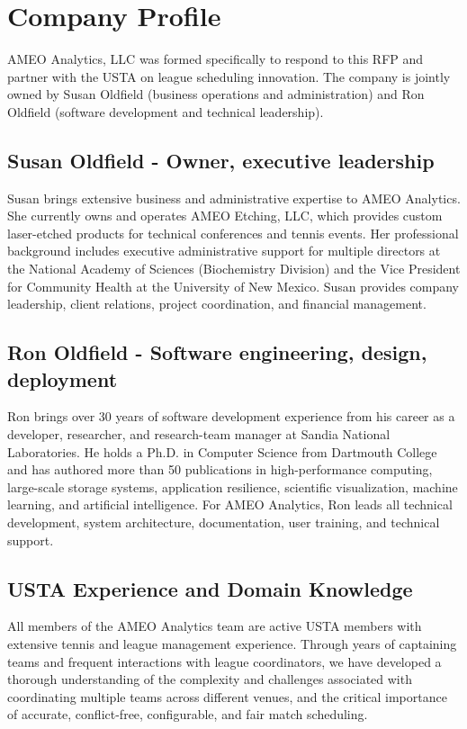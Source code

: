 \section{Company Profile}

AMEO Analytics, LLC was formed specifically to respond to this RFP and partner with the USTA on league scheduling innovation. The company is jointly owned by Susan Oldfield (business operations and administration) and Ron Oldfield (software development and technical leadership).

\subsection*{Susan Oldfield - Owner, executive leadership}
Susan brings extensive business and administrative expertise to AMEO Analytics. She currently owns and operates AMEO Etching, LLC, which provides custom laser-etched products for technical conferences and tennis events. Her professional background includes executive administrative support for multiple directors at the National Academy of Sciences (Biochemistry Division) and the Vice President for Community Health at the University of New Mexico. Susan provides company leadership, client relations, project coordination, and financial management.

\subsection*{Ron Oldfield - Software engineering, design, deployment}
Ron brings over 30 years of software development experience from his career as a developer, researcher, and research-team manager at Sandia National Laboratories. He holds a Ph.D. in Computer Science from Dartmouth College and has authored more than 50 publications in high-performance computing, large-scale storage systems, application resilience, scientific visualization, machine learning, and artificial intelligence. For AMEO Analytics, Ron leads all technical development, system architecture, documentation, user training, and technical support.


\subsection*{USTA Experience and Domain Knowledge}
All members of the AMEO Analytics team are active USTA members with extensive tennis and league management experience. Through years of captaining teams and frequent interactions with league coordinators, we have developed a thorough understanding of the complexity and challenges associated with coordinating multiple teams across different venues, and the critical importance of accurate, conflict-free, configurable, and fair match scheduling.

